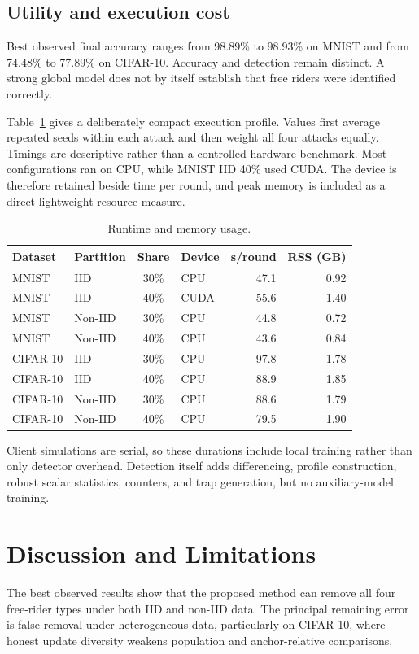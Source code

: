\documentclass[conference]{IEEEtran}
\begin{document}
\subsection{Utility and execution cost}
Best observed final accuracy ranges from 98.89\% to 98.93\% on MNIST and from 74.48\% to 77.89\% on CIFAR-10. Accuracy and detection remain distinct. A strong global model does not by itself establish that free riders were identified correctly.

Table~\ref{tab:cost} gives a deliberately compact execution profile. Values first average repeated seeds within each attack and then weight all four attacks equally. Timings are descriptive rather than a controlled hardware benchmark. Most configurations ran on CPU, while MNIST IID 40\% used CUDA. The device is therefore retained beside time per round, and peak memory is included as a direct lightweight resource measure.

\begin{table}[t]
\centering
\caption{Runtime and memory usage.}
\label{tab:cost}
\footnotesize
\setlength{\tabcolsep}{2.5pt}
\begin{tabular}{llclrr}
\toprule
Dataset & Partition & Share & Device & s/round & RSS (GB) \\
\midrule
MNIST & IID     & 30\% & CPU  & 47.1 & 0.92 \\
MNIST & IID     & 40\% & CUDA & 55.6 & 1.40 \\
MNIST & Non-IID & 30\% & CPU  & 44.8 & 0.72 \\
MNIST & Non-IID & 40\% & CPU  & 43.6 & 0.84 \\
CIFAR-10 & IID     & 30\% & CPU & 97.8 & 1.78 \\
CIFAR-10 & IID     & 40\% & CPU & 88.9 & 1.85 \\
CIFAR-10 & Non-IID & 30\% & CPU & 88.6 & 1.79 \\
CIFAR-10 & Non-IID & 40\% & CPU & 79.5 & 1.90 \\
\bottomrule
\end{tabular}
\end{table}

Client simulations are serial, so these durations include local training rather than only detector overhead. Detection itself adds differencing, profile construction, robust scalar statistics, counters, and trap generation, but no auxiliary-model training.

\FloatBarrier
\section{Discussion and Limitations}
The best observed results show that the proposed method can remove all four free-rider types under both IID and non-IID data. The principal remaining error is false removal under heterogeneous data, particularly on CIFAR-10, where honest update diversity weakens population and anchor-relative comparisons.
\end{document}
